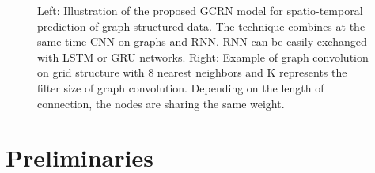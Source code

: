 \documentclass{article} %
\newcommand{\todo}[1]{{\color{red} #1 }}
\begin{document}
\begin{figure}[ht]
	\centering
	\hfill
	\caption{Left: Illustration of the proposed GCRN model for spatio-temporal prediction of graph-structured data. The technique combines at the same time CNN on graphs and RNN. RNN can be easily exchanged with LSTM or GRU networks. Right: Example of graph convolution on grid structure with 8 nearest neighbors and K represents the filter size of graph convolution. Depending on the length of connection, the nodes are sharing the same weight.}
	\label{fig1}
\end{figure}




\section{Preliminaries}
\end{document}
